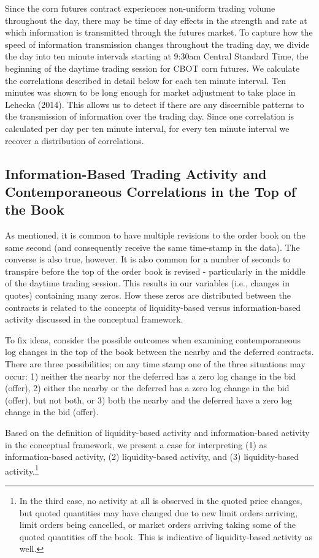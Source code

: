 \documentclass[]{elsarticle} %
\begin{document}
Since the corn futures contract experiences non-uniform trading volume
throughout the day, there may be time of day effects in the strength and
rate at which information is transmitted through the futures market. To
capture how the speed of information transmission changes throughout the
trading day, we divide the day into ten minute intervals starting at
9:30am Central Standard Time, the beginning of the daytime trading
session for CBOT corn futures. We calculate the correlations described
in detail below for each ten minute interval. Ten minutes was shown to
be long enough for market adjustment to take place in Lehecka (2014).
This allows us to detect if there are any discernible patterns to the
transmission of information over the trading day. Since one correlation
is calculated per day per ten minute interval, for every ten minute
interval we recover a distribution of correlations.

\subsection{Information-Based Trading Activity and Contemporaneous
Correlations in the Top of the
Book}\label{information-based-trading-activity-and-contemporaneous-correlations-in-the-top-of-the-book}

As mentioned, it is common to have multiple revisions to the order book
on the same second (and consequently receive the same time-stamp in the
data). The converse is also true, however. It is also common for a
number of seconds to transpire before the top of the order book is
revised - particularly in the middle of the daytime trading session.
This results in our variables (i.e., changes in quotes) containing many
zeros. How these zeros are distributed between the contracts is related
to the concepts of liquidity-based versus information-based activity
discussed in the conceptual framework.

To fix ideas, consider the possible outcomes when examining
contemporaneous log changes in the top of the book between the nearby
and the deferred contracts. There are three possibilities; on any time
stamp one of the three situations may occur: 1) neither the nearby nor
the deferred has a zero log change in the bid (offer), 2) either the
nearby or the deferred has a zero log change in the bid (offer), but not
both, or 3) both the nearby and the deferred have a zero log change in
the bid (offer).

Based on the definition of liquidity-based activity and
information-based activity in the conceptual framework, we present a
case for interpreting (1) as information-based activity, (2)
liquidity-based activity, and (3) liquidity-based activity.\footnote{In
  the third case, no activity at all is observed in the quoted price
  changes, but quoted quantities may have changed due to new limit
  orders arriving, limit orders being cancelled, or market orders
  arriving taking some of the quoted quantities off the book. This is
  indicative of liquidity-based activity as well.}
\end{document}
